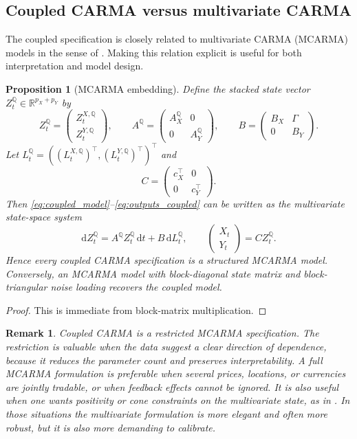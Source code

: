 \documentclass[10pt,reqno]{amsart}
\newtheorem{proposition}[theorem]{Proposition}
\newtheorem{remark}[theorem]{Remark}
\newcommand{\R}{\mathbb{R}}
\newcommand{\Q}{\mathbb{Q}}
\newcommand{\1}{\mathbbm{1}}
\newcommand{\dd}{\mathrm{d}}
\begin{document}
\subsection{Coupled CARMA versus multivariate CARMA}

The coupled specification is closely related to multivariate CARMA (MCARMA)
models in the sense of \citet{Mar07}. Making this relation explicit is useful
for both interpretation and model design.

\begin{proposition}[MCARMA embedding]
\label{prop:mcarma_embedding}
Define the stacked state vector $Z_t^\Q \in \R^{p_X+p_Y}$ by
$$
Z_t^\Q
= \begin{pmatrix}
    Z_t^{X,\Q}\\
    Z_t^{Y,\Q}
  \end{pmatrix},
\qquad
A^\Q
= \begin{pmatrix}
    A_X^\Q & 0\\
    0 & A_Y^\Q
  \end{pmatrix},
\qquad
B
= \begin{pmatrix}
    B_X & \Gamma\\
    0 & B_Y
  \end{pmatrix}.
$$
Let $L_t^\Q = ((L_t^{X,\Q})^\top,(L_t^{Y,\Q})^\top)^\top$ and
$$
C
= \begin{pmatrix}
    c_X^\top & 0\\
    0 & c_Y^\top
  \end{pmatrix}.
$$
Then \eqref{eq:coupled_model}--\eqref{eq:outputs_coupled} can be written as the
multivariate state-space system
$$
\dd Z_t^\Q = A^\Q Z_t^\Q\,\dd t + B\,\dd L_t^\Q,
\qquad
\begin{pmatrix}
  X_t\\
  Y_t
\end{pmatrix}
= C Z_t^\Q.
$$
Hence every coupled CARMA specification is a structured MCARMA model. Conversely,
an MCARMA model with block-diagonal state matrix and block-triangular noise
loading recovers the coupled model.
\end{proposition}

\begin{proof}
This is immediate from block-matrix multiplication.
\end{proof}

\begin{remark}
Coupled CARMA is a restricted MCARMA specification. The restriction is valuable
when the data suggest a clear
direction of dependence, because it reduces the parameter count and preserves
interpretability. A full MCARMA formulation is preferable when several prices,
locations, or currencies are jointly tradable, or when feedback effects cannot
be ignored. It is also useful when one wants positivity or cone constraints on
the multivariate state, as in \citet{Ben23}. In those situations the
multivariate formulation is more elegant and often more robust, but it is also
more demanding to calibrate.
\end{remark}
\end{document}
